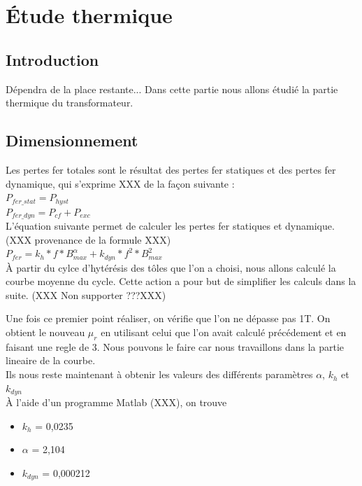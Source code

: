 \section{Étude thermique}

\subsection{Introduction}
Dépendra de la place restante...
Dans cette partie nous allons étudié la partie thermique du transformateur. 



\subsection{Dimensionnement}
Les pertes fer totales sont le résultat des pertes fer statiques et des pertes fer dynamique, qui s'exprime XXX de la façon suivante : \\
$ P_{fer\_stat} = P_{hyst}$\\
$ P_{fer\_dyn} = P_{cf} + P_{exc}$\\

L'équation suivante permet de calculer les pertes fer statiques et dynamique. (XXX provenance de la formule XXX)\\
$ P_{fer} = k_h*f*B_{max}^{\alpha} + k_{dyn}*f^2*B_{max}^2$\\
  
À partir du cylce d'hytérésis des tôles que l'on a choisi, nous allons calculé la courbe moyenne du cycle. Cette action a pour but de simplifier les calculs dans la suite. (XXX Non supporter ???XXX) 

Une fois ce premier point réaliser, on vérifie que l'on ne dépasse pas 1T. On obtient le nouveau $\mu_r$ en utilisant celui que l'on avait calculé précédement et en faisant une regle de 3. Nous pouvons le faire car nous travaillons dans la partie lineaire de la courbe.\\



Ils nous reste maintenant à obtenir les valeurs des différents paramètres  $\alpha$, $k_h$ et $k_{dyn}$\\


À l'aide d'un programme Matlab (XXX), on trouve 
\begin{itemize}
\item  $k_h$   = 0,0235
\item $\alpha$ = 2,104
\item $k_{dyn}$ = 0,000212
\end{itemize}



